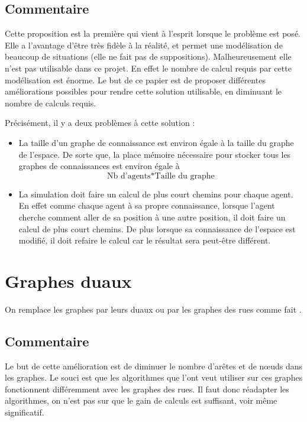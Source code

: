 \documentclass[a4paper]{article}
\begin{document}
  \subsection{Commentaire}

Cette proposition est la première qui vient à l'esprit lorsque le problème est
posé. Elle a l'avantage d'être très fidèle à la réalité, et permet une
modélisation de beaucoup de situations (elle ne fait pas de suppositions).
Malheureusement elle n'est pas utilisable dans ce projet. En effet le nombre de
calcul requis par cette modélisation est énorme. Le but de ce papier est de
proposer différentes améliorations possibles pour rendre cette solution
utilisable, en diminuant le nombre de calculs requis.

Précisément, il y a deux problèmes à cette solution :

\begin{itemize}
  \item

La taille d'un graphe de connaissance est environ égale à la taille du
graphe de l'espace. De sorte que, la place mémoire nécessaire pour stocker
tous les graphes de connaissances est environ égale à \[\text{Nb d'agents} *
\text{Taille du graphe}\]

  \item

La simulation doit faire un calcul de plus court chemins pour chaque
agent. En effet comme chaque agent à sa propre connaissance, lorsque l'agent
cherche comment aller de sa position à une autre position, il doit faire un
calcul de plus court chemins. De plus lorsque sa connaissance de l'espace
est modifié, il doit refaire le calcul car le résultat sera peut-être
différent.

\end{itemize}

\section{Graphes duaux}

On remplace les graphes par leurs duaux ou par les graphes des rues comme fait
\cite{porta2005}.
  \subsection{Commentaire}

Le but de cette amélioration est de diminuer le nombre d'arêtes et de nœuds dans
les graphes. Le souci est que les algorithmes que l'ont veut utiliser sur ces
graphes fonctionnent différemment avec les graphes des rues. Il faut donc
réadapter les algorithmes, on n'est pas sur que le gain de calculs est
suffisant, voir même significatif.
\end{document}
